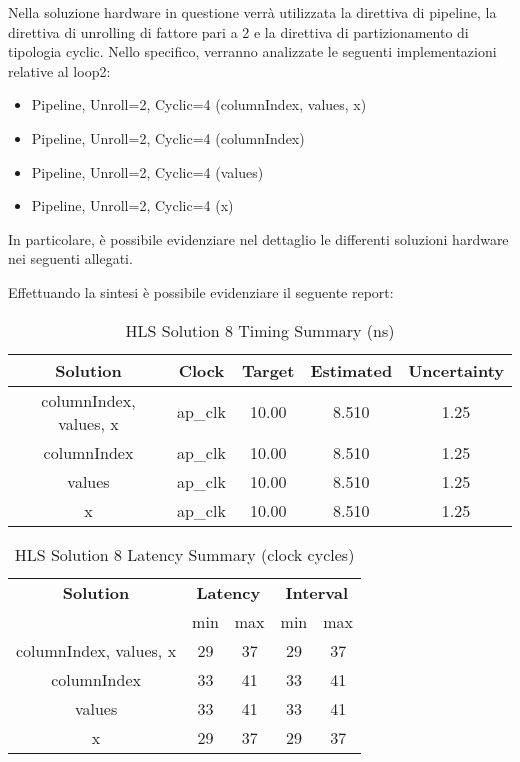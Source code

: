 Nella soluzione hardware in questione verrà utilizzata la direttiva di pipeline, la direttiva di unrolling di fattore pari a 2 e la direttiva di partizionamento di tipologia cyclic. Nello specifico, verranno analizzate le seguenti implementazioni relative al loop2:
\begin{itemize}
	\item Pipeline, Unroll=2, Cyclic=4 (columnIndex, values, x)
	\item Pipeline, Unroll=2, Cyclic=4 (columnIndex)
	\item Pipeline, Unroll=2, Cyclic=4 (values)
	\item Pipeline, Unroll=2, Cyclic=4 (x)
\end{itemize}

In particolare, è possibile evidenziare nel dettaglio le differenti soluzioni hardware nei seguenti allegati.





Effettuando la sintesi è possibile evidenziare il seguente report:\\

\begin{table}[H]
	\centering
	\begin{tabular}{|c|c|c|c|c|}
		\hline
		\textbf{Solution} & \textbf{Clock} & \textbf{Target} & \textbf{Estimated} & \textbf{Uncertainty} \\
		\hline
		columnIndex, values, x & ap\_clk & 10.00 & 8.510 & 1.25 \\
		\hline
		columnIndex & ap\_clk & 10.00 & 8.510 & 1.25 \\
		\hline
		values & ap\_clk & 10.00 & 8.510 & 1.25 \\
		\hline
		x & ap\_clk & 10.00 & 8.510 & 1.25 \\
		\hline
	\end{tabular}
	\caption{HLS Solution 8 Timing Summary (ns)}
	\label{tab:hls-solution-8-timing-summary}
\end{table}

\begin{table}[H]
	\centering
	\begin{tabular}{|c|c|c|c|c|}
		\hline
		\multicolumn{1}{|c|}{\textbf{Solution}} & \multicolumn{2}{|c|}{\textbf{Latency}} & \multicolumn{2}{|c|}{\textbf{Interval}} \\
		& min & max & min & max \\
		\hline
		columnIndex, values, x & 29 & 37 & 29 & 37 \\
		\hline
		columnIndex & 33 & 41 & 33 & 41 \\
		\hline
		values & 33 & 41 & 33 & 41 \\
		\hline
		x & 29 & 37 & 29 & 37 \\
		\hline
	\end{tabular}
	\caption{HLS Solution 8 Latency Summary (clock cycles)}
	\label{tab:hls-solution-8-latency-summary}
\end{table}

